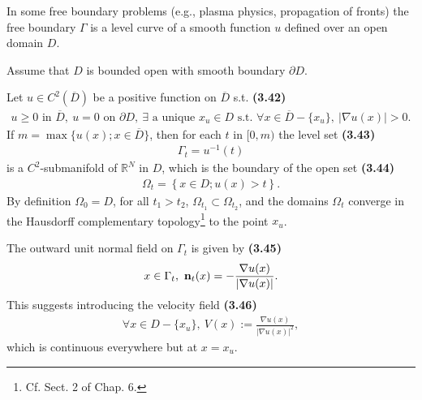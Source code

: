 \documentclass{book}
\numberwithin{equation}{section}
\begin{document}
\begin{enumerate}
\begin{enumerate}
        In some free boundary problems (e.g., plasma physics, propagation of fronts) the free boundary $\Gamma$ is a level curve of a smooth function $u$ defined over an open domain $D$.
        
        Assume that $D$ is bounded open with smooth boundary $\partial D$.
        
        Let $u\in C^2(\overline{D})$ be a positive function on $\overline{D}$ s.t. \textbf{(3.42)}
        \begin{align*}
            u\ge 0 \mbox{ in } \overline{D},\ u = 0 \mbox{ on } \partial D,\ \exists \mbox{ a unique } x_u\in D \mbox{ s.t. } \forall x\in\overline{D} - \{x_u\},\ \left|\nabla u(x)\right| > 0.
        \end{align*}
        If $m = \max\{u(x);x\in\overline{D}\}$, then for each $t$ in $[0,m)$ the level set \textbf{(3.43)}
        \begin{align*}
            \Gamma_t = u^{-1}(t)
        \end{align*}
        is a $C^2$-submanifold of $\mathbb{R}^N$ in $D$, which is the boundary of the open set \textbf{(3.44)}
        \begin{align*}
            \Omega_t = \left\{x\in D;u(x) > t\right\}.
        \end{align*}
        By definition $\Omega_0 = D$, for all $t_1 > t_2$, $\Omega_{t_1}\subset\Omega_{t_2}$, and the domains $\Omega_t$ converge in the Hausdorff complementary topology\footnote{Cf. Sect. 2 of Chap. 6.} to the point $x_u$.
        
        The outward unit normal field on $\Gamma_t$ is given by \textbf{(3.45)}
        \begin{align*}
            x\in\Gamma_t,\ {\bf n}_t(x) = -\frac{\nabla u(x)}{\left|\nabla u(x)\right|}.
        \end{align*}
        This suggests introducing the velocity field \textbf{(3.46)}
        \begin{align*}
            \forall x\in D - \{x_u\},\ V(x) := \frac{\nabla u(x)}{\left|\nabla u(x)\right|^2},
        \end{align*}
        which is continuous everywhere but at $x = x_u$.
        

\end{enumerate}
\end{enumerate}
\end{document}
